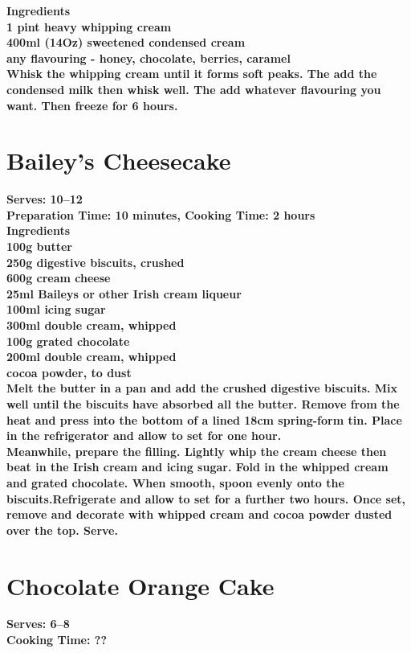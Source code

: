 \documentclass[18pt, oneside]{book}
\begin{document}
\bf{Ingredients} \normalfont \\
1 pint heavy whipping cream \\
400ml (14Oz) sweetened condensed cream \\
any flavouring - honey, chocolate, berries, caramel \\

Whisk the whipping cream until it forms soft peaks. The add the condensed milk then whisk well. The add whatever flavouring you want. Then freeze for 6 hours. 


\section{Bailey's Cheesecake}
\bf{Serves: 10--12} \\
\bf{Preparation Time: 10 minutes, Cooking Time: 2 hours} \\ 

\bf{Ingredients} \normalfont \\ 
100g butter \\
250g digestive biscuits, crushed \\
600g cream cheese \\
25ml Baileys or other Irish cream liqueur \\
100ml icing sugar \\
300ml double cream, whipped \\
100g grated chocolate \\
200ml double cream, whipped \\
cocoa powder, to dust \\ 

Melt the butter in a pan and add the crushed digestive biscuits. Mix well until the biscuits have absorbed all the butter. Remove from the heat and press into the bottom of a lined 18cm spring-form tin. Place in the refrigerator and allow to set for one hour. \\

Meanwhile, prepare the filling. Lightly whip the cream cheese then beat in the Irish cream and icing sugar. Fold in the whipped cream and grated chocolate. When smooth, spoon evenly onto the biscuits.Refrigerate and allow to set for a further two hours. Once set, remove and decorate with whipped cream and cocoa powder dusted over the top. Serve.

\section{Chocolate Orange Cake}
\bf{Serves: 6--8} \\
\bf{Cooking Time: ??} \\ 
\end{document}
